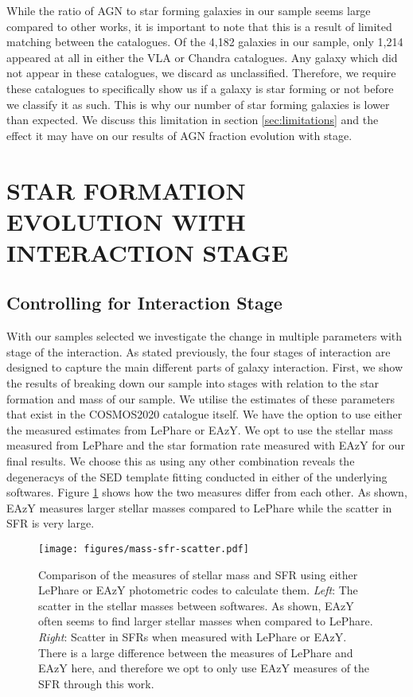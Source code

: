 \documentclass[fleqn,usenatbib]{mnras}
\begin{document}
While the ratio of AGN to star forming galaxies in our sample seems large compared to other works, it is important to note that this is a result of limited matching between the catalogues. Of the 4,182 galaxies in our sample, only 1,214 appeared at all in either the VLA or Chandra catalogues. Any galaxy which did not appear in these catalogues, we discard as unclassified. Therefore, we require these catalogues to specifically show us if a galaxy is star forming or not before we classify it as such. This is why our number of star forming galaxies is lower than expected. We discuss this limitation in section \ref{sec:limitations} and the effect it may have on our results of AGN fraction evolution with stage.

\section{STAR FORMATION EVOLUTION WITH INTERACTION STAGE}\label{results}
\subsection{Controlling for Interaction Stage}
\noindent With our samples selected we investigate the change in multiple parameters with stage of the interaction. As stated previously, the four stages of interaction are designed to capture the main different parts of galaxy interaction. First, we show the results of breaking down our sample into stages with relation to the star formation and mass of our sample. We utilise the estimates of these parameters that exist in the COSMOS2020 catalogue itself. We have the option to use either the measured estimates from LePhare or EAzY. We opt to use the stellar mass measured from LePhare and the star formation rate measured with EAzY for our final results. We choose this as using any other combination reveals the degeneracys of the SED template fitting conducted in either of the underlying softwares. Figure \ref{fig:difference-measures} shows how the two measures differ from each other. As shown, EAzY measures larger stellar masses compared to LePhare while the scatter in SFR is very large.

\begin{figure}
    \centering
    \texttt{[image: figures/mass-sfr-scatter.pdf]}
    \caption{Comparison of the measures of stellar mass and SFR using either LePhare or EAzY photometric codes to calculate them. \textit{Left}: The scatter in the stellar masses between softwares. As shown, EAzY often seems to find larger stellar masses when compared to LePhare. \textit{Right}: Scatter in SFRs when measured with LePhare or EAzY. There is a large difference between the measures of LePhare and EAzY here, and therefore we opt to only use EAzY measures of the SFR through this work.}
    \label{fig:difference-measures}
\end{figure}
\end{document}
